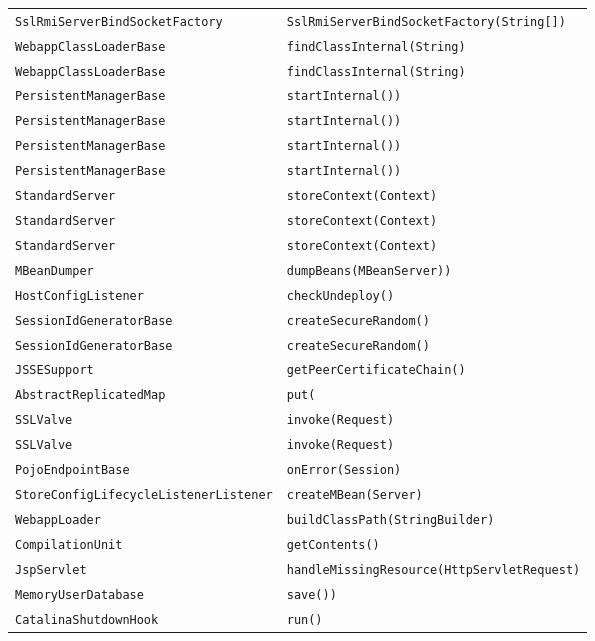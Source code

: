 \begin{center}
\begin{longtable}{ll}
\lstinline/SslRmiServerBindSocketFactory/&{\lstinline/SslRmiServerBindSocketFactory(String[])/}\\
\lstinline/WebappClassLoaderBase/&{\lstinline/findClassInternal(String)/}\\
\lstinline/WebappClassLoaderBase/&{\lstinline/findClassInternal(String)/}\\
\lstinline/PersistentManagerBase/&{\lstinline/startInternal())/}\\
\lstinline/PersistentManagerBase/&{\lstinline/startInternal())/}\\
\lstinline/PersistentManagerBase/&{\lstinline/startInternal())/}\\
\lstinline/PersistentManagerBase/&{\lstinline/startInternal())/}\\
\lstinline/StandardServer/&{\lstinline/storeContext(Context)/}\\
\lstinline/StandardServer/&{\lstinline/storeContext(Context)/}\\
\lstinline/StandardServer/&{\lstinline/storeContext(Context)/}\\
\lstinline/MBeanDumper/&{\lstinline/dumpBeans(MBeanServer))/}\\
\lstinline/HostConfigListener/&{\lstinline/checkUndeploy()/}\\
\lstinline/SessionIdGeneratorBase/&{\lstinline/createSecureRandom()/}\\
\lstinline/SessionIdGeneratorBase/&{\lstinline/createSecureRandom()/}\\
\lstinline/JSSESupport/&{\lstinline/getPeerCertificateChain()/}\\
\lstinline/AbstractReplicatedMap/&{\lstinline/put(/}\\
\lstinline/SSLValve/&{\lstinline/invoke(Request)/}\\
\lstinline/SSLValve/&{\lstinline/invoke(Request)/}\\
\lstinline/PojoEndpointBase/&{\lstinline/onError(Session)/}\\
\lstinline/StoreConfigLifecycleListenerListener/&{\lstinline/createMBean(Server)/}\\
\lstinline/WebappLoader/&{\lstinline/buildClassPath(StringBuilder)/}\\
\lstinline/CompilationUnit/&{\lstinline/getContents()/}\\
\lstinline/JspServlet/&{\lstinline/handleMissingResource(HttpServletRequest)/}\\
\lstinline/MemoryUserDatabase/&{\lstinline/save())/}\\
\lstinline/CatalinaShutdownHook/&{\lstinline/run()/}\\

\end{longtable}
\end{center}
